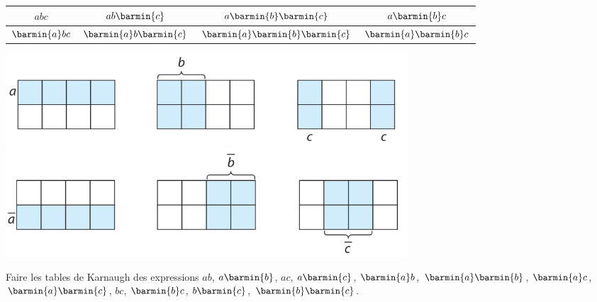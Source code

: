 \documentclass[a4paper,12pt,french]{book}
\begin{document}
\begin{center}
	\begin{tabular}{|c|c|c|c|}

		\hline
		$abc$ & $ab\barmin{c}$ & $a\barmin{b}\barmin{c}$ &  $a\barmin{b}c$\\
		\hline
		$\barmin{a}bc$ & $\barmin{a}b\barmin{c}$ & $\barmin{a}\barmin{b}\barmin{c}$ &  $\barmin{a}\barmin{b}c$\\
				\hline
	\end{tabular}
\end{center}
\begin{center}
	\includegraphics[width=15cm]{karnaugh2.png}\\

	\includegraphics[width=15cm]{karnaugh3.png}
\end{center}

\begin{exercice}[]
	Faire les tables de Karnaugh des expressions $ab$, $a\barmin{b}$, $ac$, $a\barmin{c}$,  $\barmin{a}b$, $\barmin{a}\barmin{b}$, $\barmin{a}c$, $\barmin{a}\barmin{c}$, $bc$, $\barmin{b}c$, $b\barmin{c}$, $\barmin{b}\barmin{c}$.
\end{exercice}
\end{document}
